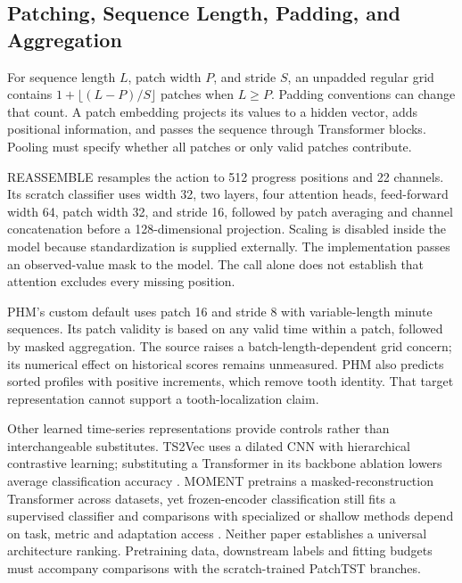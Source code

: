 \subsection{Patching, Sequence Length, Padding, and Aggregation}
For sequence length $L$, patch width $P$, and stride $S$, an unpadded regular grid contains $1+\lfloor(L-P)/S\rfloor$ patches when $L\geq P$. Padding conventions can change that count. A patch embedding projects its values to a hidden vector, adds positional information, and passes the sequence through Transformer blocks. Pooling must specify whether all patches or only valid patches contribute.

REASSEMBLE resamples the action to 512 progress positions and 22 channels. Its scratch classifier uses width 32, two layers, four attention heads, feed-forward width 64, patch width 32, and stride 16, followed by patch averaging and channel concatenation before a 128-dimensional projection. Scaling is disabled inside the model because standardization is supplied externally. The implementation passes an observed-value mask to the model. The call alone does not establish that attention excludes every missing position.

PHM's custom default uses patch 16 and stride 8 with variable-length minute sequences. Its patch validity is based on any valid time within a patch, followed by masked aggregation. The source raises a batch-length-dependent grid concern; its numerical effect on historical scores remains unmeasured. PHM also predicts sorted profiles with positive increments, which remove tooth identity. That target representation cannot support a tooth-localization claim.

Other learned time-series representations provide controls rather than interchangeable substitutes. TS2Vec uses a dilated CNN with hierarchical contrastive learning; substituting a Transformer in its backbone ablation lowers average classification accuracy \citep{P012}. MOMENT pretrains a masked-reconstruction Transformer across datasets, yet frozen-encoder classification still fits a supervised classifier and comparisons with specialized or shallow methods depend on task, metric and adaptation access \citep{P018}. Neither paper establishes a universal architecture ranking. Pretraining data, downstream labels and fitting budgets must accompany comparisons with the scratch-trained PatchTST branches.

